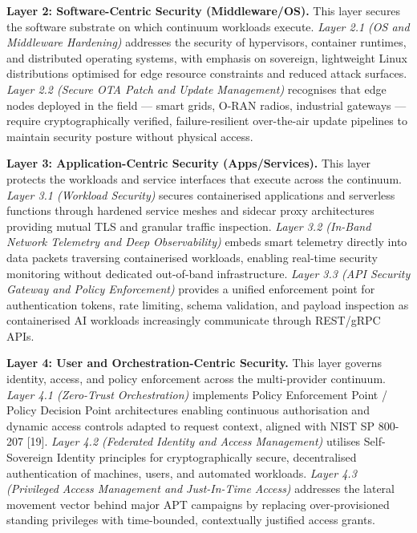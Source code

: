 \documentclass{ieeeaccess}
\begin{document}
\textbf{Layer 2: Software-Centric Security (Middleware/OS).} This layer
secures the software substrate on which continuum workloads execute.
\emph{Layer 2.1 (OS and Middleware Hardening)} addresses the security of
hypervisors, container runtimes, and distributed operating systems, with
emphasis on sovereign, lightweight Linux distributions optimised for
edge resource constraints and reduced attack surfaces. \emph{Layer 2.2
(Secure OTA Patch and Update Management)} recognises that edge nodes
deployed in the field --- smart grids, O-RAN radios, industrial gateways
--- require cryptographically verified, failure-resilient over-the-air
update pipelines to maintain security posture without physical access.

\textbf{Layer 3: Application-Centric Security (Apps/Services).} This
layer protects the workloads and service interfaces that execute across
the continuum. \emph{Layer 3.1 (Workload Security)} secures
containerised applications and serverless functions through hardened
service meshes and sidecar proxy architectures providing mutual TLS and
granular traffic inspection. \emph{Layer 3.2 (In-Band Network Telemetry
and Deep Observability)} embeds smart telemetry directly into data
packets traversing containerised workloads, enabling real-time security
monitoring without dedicated out-of-band infrastructure. \emph{Layer 3.3
(API Security Gateway and Policy Enforcement)} provides a unified
enforcement point for authentication tokens, rate limiting, schema
validation, and payload inspection as containerised AI workloads
increasingly communicate through REST/gRPC APIs.

\textbf{Layer 4: User and Orchestration-Centric Security.} This layer
governs identity, access, and policy enforcement across the
multi-provider continuum. \emph{Layer 4.1 (Zero-Trust Orchestration)}
implements Policy Enforcement Point / Policy Decision Point
architectures enabling continuous authorisation and dynamic access
controls adapted to request context, aligned with NIST SP 800-207
{[}19{]}. \emph{Layer 4.2 (Federated Identity and Access Management)}
utilises Self-Sovereign Identity principles for cryptographically
secure, decentralised authentication of machines, users, and automated
workloads. \emph{Layer 4.3 (Privileged Access Management and
Just-In-Time Access)} addresses the lateral movement vector behind major
APT campaigns by replacing over-provisioned standing privileges with
time-bounded, contextually justified access grants.
\end{document}
